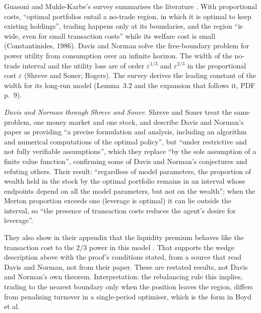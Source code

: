 \begin{qfmodel}
 Guasoni and Muhle-Karbe's survey summarises the literature \citep[arXiv v1, sec.~1, PDF p.~3]{guasoni-muhle-karbe-2012}. With proportional costs, ``optimal portfolios entail a no-trade region, in which it is optimal to keep existing holdings'', trading happens only at its boundaries, and the region ``is wide, even for small transaction costs'' while its welfare cost is small (Constantinides, 1986). Davis and Norman solve the free-boundary problem for power utility from consumption over an infinite horizon. The width of the no-trade interval and the utility loss are of order $\varepsilon^{1/3}$ and $\varepsilon^{2/3}$ in the proportional cost $\varepsilon$ (Shreve and Soner; Rogers). The survey derives the leading constant of the width for its long-run model (Lemma~3.2 and the expansion that follows it, PDF p.~9).

\emph{Davis and Norman through Shreve and Soner}. Shreve and Soner treat the same problem, one money market and one stock, and describe Davis and Norman's paper as providing ``a precise formulation and analysis, including an algorithm and numerical computations of the optimal policy'', but ``under restrictive and not fully verifiable assumptions'', which they replace ``by the sole assumption of a finite value function'', confirming some of Davis and Norman's conjectures and refuting others. Their result: ``regardless of model parameters, the proportion of wealth held in the stock by the optimal portfolio remains in an interval whose endpoints depend on all the model parameters, but not on the wealth''; when the Merton proportion exceeds one (leverage is optimal) it can lie outside the interval, so ``the presence of transaction costs reduces the agent's desire for leverage''.

They also show in their appendix that the liquidity premium behaves like the transaction cost to the $2/3$ power in this model \citep[\emph{Ann.\ Appl.\ Probab.} 4(3), 1994, sec.~1, pp.~610--612]{shreve-soner-1994}. That supports the wedge description above with the proof's conditions stated, from a source that read Davis and Norman, not from their paper. These are restated results, not Davis and Norman's own theorem. Interpretation: the rebalancing rule this implies, trading to the nearest boundary only when the position leaves the region, differs from penalising turnover in a single-period optimiser, which is the form in Boyd et al.

\end{qfmodel}
